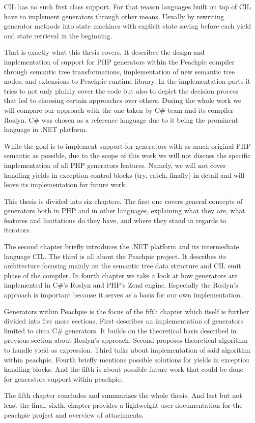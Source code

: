CIL has no such first class support. For that reason languages built on top of CIL have to implement generators through other means. Usually by rewriting generator methods into state machines with explicit state saving before each yield and state retrieval in the beginning.

That is exactly what this thesis covers. It describes the design and implementation of support for PHP generators within the Peachpie compiler through semantic tree transformations, implementation of new semantic tree nodes, and extensions to Peachpie runtime library. In the implementation parts it tries to not only plainly cover the code but also to depict the decision process that led to choosing certain approaches over others. During the whole work we will compare our approach with the one taken by C\# team and its compiler Roslyn. C\# was chosen as a reference language due to it being the prominent language in .NET platform.

While the goal is to implement support for generators with as much original PHP semantic as possible, due to the scope of this work we will not discuss the specific implementation of all PHP generators features. Namely, we will not cover handling yields in exception control blocks (try, catch, finally) in detail and will leave its implementation for future work.


This thesis is divided into six chapters. The first one covers general concepts of generators both in PHP and in other languages, explaining what they are, what features and limitations do they have, and where they stand in regards to iterators. 

The second chapter briefly introduces the .NET platform and its intermediate language CIL. The third is all about the Peachpie project. It describes its architecture focusing mainly on the semantic tree data structure and CIL emit phase of the compiler. In fourth chapter we take a look at how generators are implemented in C\#’s Roslyn and PHP’s Zend engine. Especially the Roslyn’s approach is important because it serves as a basis for our own implementation. 

Generators within Peachpie is the focus of the fifth chapter which itself is further divided into five more sections. First describes an implementation of generators limited to circa C\# generators. It builds on the theoretical basis described in previous section about Roslyn’s approach. Second proposes theoretical algorithm to handle yield as expression. Third talks about implementation of said algorithm within peachpie. Fourth briefly mentions possible solutions for yields in exception handling blocks. And the fifth is about possible future work that could be done for generators support within peachpie. 

The fifth chapter concludes and summarizes the whole thesis. And last but not least the final, sixth, chapter provides a lightweight user documentation for the peachpie project and overview of attachments.

